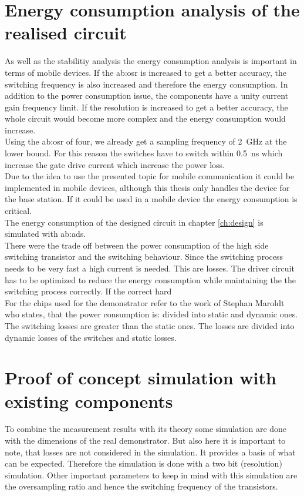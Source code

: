 \section{Energy consumption analysis of the realised circuit}
As well as the stabilitiy analysis the energy consumption analysis is important in terms of mobile devices.
If the \gls{ab:osr} is increased to get a better accuracy, the switching frequency is also increased and therefore the energy consumption.
In addition to the power consumption issue, the components have a unity current gain frequency limit.
If the resolution is increased to get a better accuracy, the whole circuit would become more complex and the energy consumption would increase.\\
Using the \gls{ab:osr} of four, we already get a sampling frequency of \SI{2}{GHz} at the lower bound.
For this reason the switches have to switch within \SI{0.5}{\nano \second} which increase the gate drive current which increase the power loss.\\
Due to the idea to use the presented topic for mobile communication it could be implemented in mobile devices, although this thesis only handles the device for the base station. If it could be used in a mobile device the energy consumption is critical.\\
The energy consumption of the designed circuit in chapter \ref{ch:design} is simulated with \gls{ab:ads}.\\
There were the trade off between the power consumption of the high side switching transistor and the switching behaviour.
Since the switching process needs to be very fast a high current is needed.
This are losses.
The driver circuit has to be optimized to reduce the energy consumption while maintaining the the switching process correctly.
If the correct hard 
\\
 For the chips used for the demonstrator refer to the work of Stephan Maroldt who states, that the power consumption is:  divided into static and dynamic ones. The switching losses are greater than the static ones.
The losses are divided into dynamic losses of the switches and static losses.

\section{Proof of concept simulation with existing components}
\label{ch:ProofOfConceptWithExistingComponents}
To combine the measurement results with its theory some simulation are done  with the dimensions of the real demonstrator.
But also here it is important to note, that losses are not considered in the simulation.
It provides a basis of what can be expected.
Therefore the simulation is done with a two bit (resolution) simulation.
Other important parameters to keep in mind with this simulation are the oversampling ratio and hence the switching frequency of the transistors.

